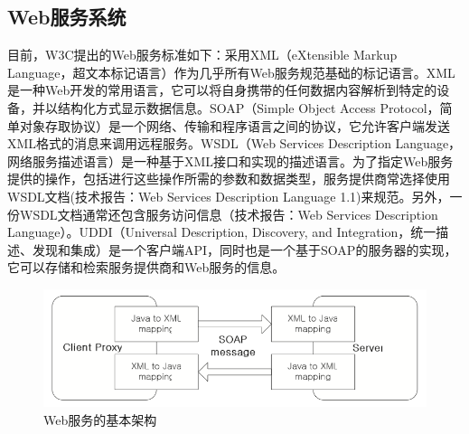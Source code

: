 \documentclass{article}
\begin{document}
\begin{CJK}{UTF8}{gbsn}
	\section{Web服务系统}
	目前，W3C提出的Web服务标准如下：采用XML（eXtensible Markup Language，超文本标记语言）作为几乎所有Web服务规范基础的标记语言。XML是一种Web开发的常用语言，它可以将自身携带的任何数据内容解析到特定的设备，并以结构化方式显示数据信息\cite{DavidKurtChris}。SOAP（Simple Object Access Protocol，简单对象存取协议）是一个网络、传输和程序语言之间的协议，它允许客户端发送XML格式的消息\cite{TR1}来调用远程服务。WSDL（Web Services Description Language，网络服务描述语言）\cite{TR2}是一种基于XML接口和实现的描述语言。为了指定Web服务提供的操作，包括进行这些操作所需的参数和数据类型，服务提供商常选择使用WSDL文档(技术报告：Web Services Description Language 1.1)来规范。另外，一份WSDL文档通常还包含服务访问信息（技术报告：Web Services Description Language）。UDDI（Universal Description, Discovery, and Integration，统一描述、发现和集成）是一个客户端API，同时也是一个基于SOAP的服务器的实现，它可以存储和检索服务提供商和Web服务的信息。
	\begin{figure}[htbp]
		\centering
		\includegraphics[bb=0 0 760 234, scale=0.45]{figure/fig01.png}
		\caption{Web服务的基本架构}
	\end{figure}


\end{CJK}
\end{document}
